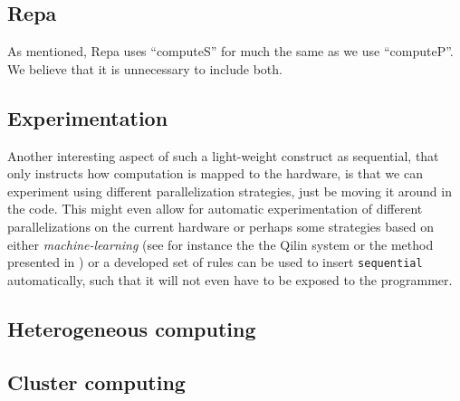 \subsection{Repa}
As mentioned,
Repa uses ``computeS'' for much the same as we use ``computeP''. We
believe that it is unnecessary to include both.

\subsection{Experimentation}
Another interesting aspect of such a light-weight construct as
sequential, that only instructs how computation is mapped to the
hardware, is that we can experiment using different parallelization
strategies, just be moving it around in the code. This might even
allow for automatic experimentation of different parallelizations on
the current hardware or perhaps some strategies based on either
\emph{machine-learning} (see for instance the the Qilin system or the
method presented in ) or a developed set of rules can be used
to insert \lstinline{sequential} automatically, such that it will not
even have to be exposed to the programmer.

\subsection{Heterogeneous computing}

\subsection{Cluster computing}




